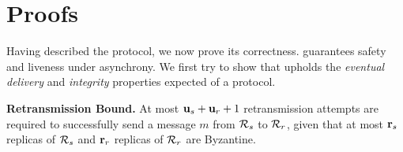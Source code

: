 \section{Proofs}
Having described the \Scrooge{} protocol, we now prove its correctness.
\Scrooge{} guarantees safety and liveness under asynchrony. 
We first try to show that \Scrooge{} upholds the {\em eventual delivery} and {\em integrity} properties 
expected of a \CCC{} protocol.
\begin{lemma}\label{th:max-retransmit}
    {\bf Retransmission Bound.} At most $\textbf{u}_{s}+\textbf{u}_{r}+1$  retransmission attempts are required to successfully send a message $m$ from 
    \RSM{} $\mathcal{R}_{s}$ to \RSM{} $\mathcal{R}_{r}$, 
    given that at most $\textbf{r}_{s}$ replicas of $\mathcal{R}_{s}$ and $\textbf{r}_{r}$ replicas of $\mathcal{R}_{r}$ are Byzantine.
\end{lemma}
